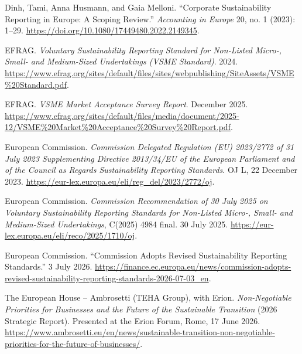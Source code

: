 Dinh, Tami, Anna Husmann, and Gaia Melloni. ``Corporate Sustainability Reporting in Europe: A Scoping Review.'' \emph{Accounting in Europe} 20, no. 1 (2023): 1--29. \url{https://doi.org/10.1080/17449480.2022.2149345}.

EFRAG. \emph{Voluntary Sustainability Reporting Standard for Non-Listed Micro-, Small- and Medium-Sized Undertakings (VSME Standard)}. 2024. \url{https://www.efrag.org/sites/default/files/sites/webpublishing/SiteAssets/VSME\%20Standard.pdf}. %

EFRAG. \emph{VSME Market Acceptance Survey Report}. December 2025. \url{https://www.efrag.org/sites/default/files/media/document/2025-12/VSME\%20Market\%20Acceptance\%20Survey\%20Report.pdf}. %

European Commission. \emph{Commission Delegated Regulation (EU) 2023/2772 of 31 July 2023 Supplementing Directive 2013/34/EU of the European Parliament and of the Council as Regards Sustainability Reporting Standards}. OJ L, 22 December 2023. \url{https://eur-lex.europa.eu/eli/reg\_del/2023/2772/oj}. %

European Commission. \emph{Commission Recommendation of 30 July 2025 on Voluntary Sustainability Reporting Standards for Non-Listed Micro-, Small- and Medium-Sized Undertakings}, C(2025) 4984 final. 30 July 2025. \url{https://eur-lex.europa.eu/eli/reco/2025/1710/oj}. %

European Commission. ``Commission Adopts Revised Sustainability Reporting Standards.'' 3 July 2026. \url{https://finance.ec.europa.eu/news/commission-adopts-revised-sustainability-reporting-standards-2026-07-03\_en}. %

The European House -- Ambrosetti (TEHA Group), with Erion. \emph{Non-Negotiable Priorities for Businesses and the Future of the Sustainable Transition} (2026 Strategic Report). Presented at the Erion Forum, Rome, 17 June 2026. \url{https://www.ambrosetti.eu/en/news/sustainable-transition-non-negotiable-priorities-for-the-future-of-businesses/}. %

